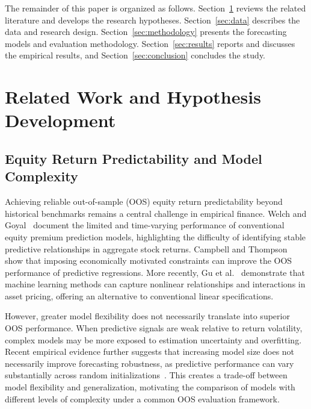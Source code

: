\documentclass[runningheads,orivec]{llncs}
\begin{document}
The remainder of this paper is organized as follows. Section~\ref{sec:lit_review} reviews the related literature and develops the research hypotheses. Section~\ref{sec:data} describes the data and research design. Section~\ref{sec:methodology} presents the forecasting models and evaluation methodology. Section~\ref{sec:results} reports and discusses the empirical results, and Section~\ref{sec:conclusion} concludes the study.


\section{Related Work and Hypothesis Development}\label{sec:lit_review}

\subsection{Equity Return Predictability and Model Complexity}

Achieving reliable out-of-sample (OOS) equity return predictability beyond historical benchmarks remains a central challenge in empirical finance. Welch and Goyal~\cite{welch2008} document the limited and time-varying performance of conventional equity premium prediction models, highlighting the difficulty of identifying stable predictive relationships in aggregate stock returns. Campbell and Thompson~\cite{campbell2008} show that imposing economically motivated constraints can improve the OOS performance of predictive regressions. More recently, Gu et al.~\cite{gu2020} demonstrate that machine learning methods can capture nonlinear relationships and interactions in asset pricing, offering an alternative to conventional linear specifications.

However, greater model flexibility does not necessarily translate into superior OOS performance. When predictive signals are weak relative to return volatility, complex models may be more exposed to estimation uncertainty and overfitting. Recent empirical evidence further suggests that increasing model size does not necessarily improve forecasting robustness, as predictive performance can vary substantially across random initializations~\cite{coakley2026}. This creates a trade-off between model flexibility and generalization, motivating the comparison of models with different levels of complexity under a common OOS evaluation framework.
\end{document}
